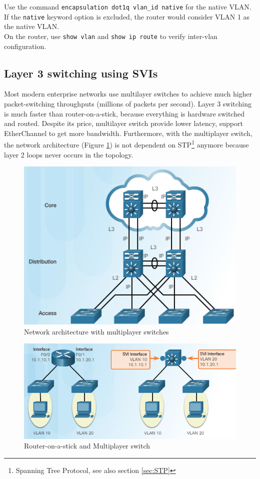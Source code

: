 \note Use the command \verb|encapsulation dot1q vlan_id native| for the native VLAN. If the \verb|native| keyword option is excluded, the router would consider VLAN 1 as the native VLAN.\\

On the router, use \verb|show vlan| and \verb|show ip route| to verify inter-vlan configuration.

\subsection{Layer 3 switching using SVIs}

Most modern enterprise networks use multilayer switches to achieve much higher packet-switching throughputs (millions of packets per second). Layer 3 switching is much faster than router-on-a-stick, because everything is hardware switched and routed. Despite its price, multilayer switch provide lower latency, support EtherChannel to get more bandwidth. Furthermore, with the multiplayer switch, the network architecture (Figure \ref{NetArch}) is not dependent on STP\footnote{Spanning Tree Protocol, see also section \ref{sec:STP} } anymore because layer 2 loops never occurs in the topology.

\begin{figure}[hbtp]
\caption{Network architecture with multiplayer switches}\label{NetArch}
\centering
\includegraphics[scale=0.6]{pictures/NetArch.PNG}
\end{figure}


\begin{figure}[hbtp]
\caption{Router-on-a-stick and Multiplayer switch}\label{Layer3sw}
\centering
\includegraphics[scale=0.6]{pictures/Layer3sw.PNG}
\end{figure}


